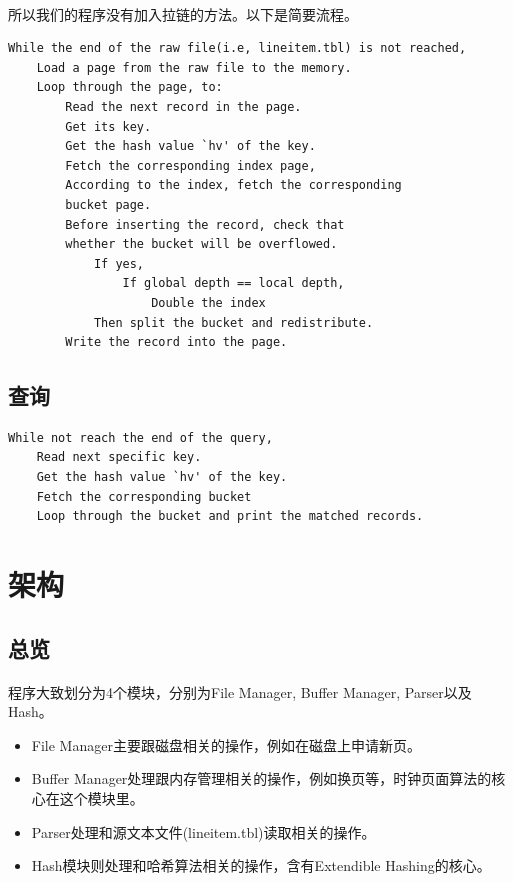 \documentclass{article}
\begin{document}
        \paragraph{}
            所以我们的程序没有加入拉链的方法。以下是简要流程。
\begin{verbatim}
While the end of the raw file(i.e, lineitem.tbl) is not reached, 
    Load a page from the raw file to the memory.
    Loop through the page, to:
        Read the next record in the page.
        Get its key.
        Get the hash value `hv' of the key.
        Fetch the corresponding index page,
        According to the index, fetch the corresponding
        bucket page.
        Before inserting the record, check that 
        whether the bucket will be overflowed.
            If yes,
                If global depth == local depth,
                    Double the index
            Then split the bucket and redistribute.
        Write the record into the page.

\end{verbatim}
    \subsection{查询}
\begin{verbatim}
While not reach the end of the query,
    Read next specific key.
    Get the hash value `hv' of the key.
    Fetch the corresponding bucket
    Loop through the bucket and print the matched records.
\end{verbatim}
\section{架构}
    \subsection{总览}
        \paragraph{}
            程序大致划分为4个模块，分别为File Manager, Buffer Manager, Parser以及Hash。
        \begin{itemize}
            \item File Manager主要跟磁盘相关的操作，例如在磁盘上申请新页。
            \item Buffer Manager处理跟内存管理相关的操作，例如换页等，时钟页面算法的核心在这个模块里。
            \item Parser处理和源文本文件(lineitem.tbl)读取相关的操作。
            \item Hash模块则处理和哈希算法相关的操作，含有Extendible Hashing的核心。
        \end{itemize}
\end{document}
